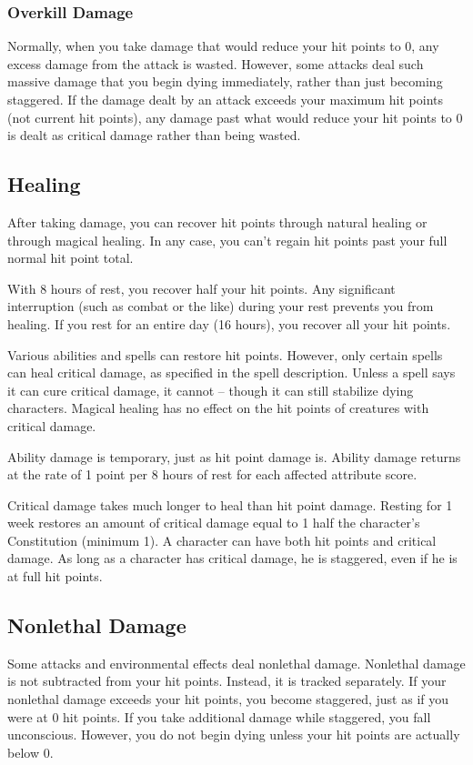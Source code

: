 \subsubsection{Overkill Damage}
Normally, when you take damage that would reduce your hit points to 0, any excess damage from the attack is wasted. However, some attacks deal such massive damage that you begin dying immediately, rather than just becoming staggered. If the damage dealt by an attack exceeds your maximum hit points (not current hit points), any damage past what would reduce your hit points to 0 is dealt as critical damage rather than being wasted.

\subsection{Healing}
After taking damage, you can recover hit points through natural healing or through magical healing. In any case, you can't regain hit points past your full normal hit point total.

 With 8 hours of rest, you recover half your hit points. Any significant interruption (such as combat or the like) during your rest prevents you from healing. If you rest for an entire day (16 hours), you recover all your hit points.

 Various abilities and spells can restore hit points. However, only certain spells can heal critical damage, as specified in the spell description. Unless a spell says it can cure critical damage, it cannot -- though it can still stabilize dying characters. Magical healing has no effect on the hit points of creatures with critical damage.

 Ability damage is temporary, just as hit point damage is. Ability damage returns at the rate of 1 point per 8 hours of rest for each affected attribute score.

 Critical damage takes much longer to heal than hit point damage. Resting for 1 week restores an amount of critical damage equal to 1 \add half the character's Constitution (minimum 1). A character can have both hit points and critical damage. As long as a character has critical damage, he is staggered, even if he is at full hit points.

\subsection{Nonlethal Damage}\label{Nonlethal Damage}
Some attacks and environmental effects deal nonlethal damage. Nonlethal damage is not subtracted from your hit points. Instead, it is tracked separately. If your nonlethal damage exceeds your hit points, you become staggered, just as if you were at 0 hit points. If you take additional damage while staggered, you fall unconscious. However, you do not begin dying unless your hit points are actually below 0. 

